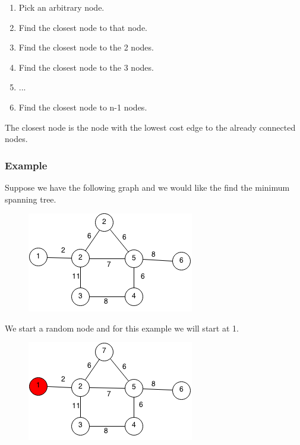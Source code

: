 \documentclass[11pt,oneside]{book}
\makeatletter
\def\maxwidth#1{\ifdim\Gin@nat@width>#1 #1\else\Gin@nat@width\fi}
\makeatother
\begin{document}
\begin{enumerate}
\item Pick an arbitrary node.
\item Find the closest node to that node.
\item Find the closest node to the 2 nodes.
\item Find the closest node to the 3 nodes.
\item ...
\item Find the closest node to n-1 nodes.
\end{enumerate}

The closest node is the node with the lowest cost edge to the already connected nodes.

\subsubsection{Example}

Suppose we have the following graph and we would like the find the minimum spanning tree.

\vspace{5px}\begin{figure}[H]\centering
        \includegraphics[width=0.66\maxwidth{\textwidth}]{prim.png}
        \end{figure}

We start a random node and for this example we will start at 1.

\vspace{5px}\begin{figure}[H]\centering
        \includegraphics[width=0.66\maxwidth{\textwidth}]{prim1.png}
        \end{figure}
\end{document}
